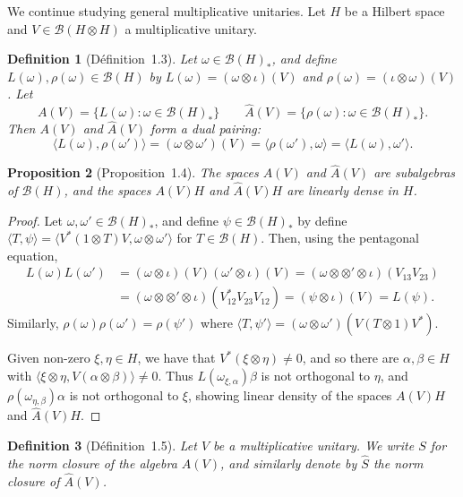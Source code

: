 \documentclass[a4paper,12pt]{article}
\theoremstyle{plain}
\newtheorem{proposition}{Proposition}[section]
\newtheorem{definition}[proposition]{Definition}
\theoremstyle{definition}
\newcommand{\ip}[2]{{\langle {#1} , {#2} \rangle}}
\newcommand{\mc}{\mathcal}
\begin{document}
We continue studying general multiplicative unitaries.
Let $H$ be a Hilbert space and $V\in\mc B(H\otimes H)$ a multiplicative
unitary.

\begin{definition}[D\'efinition~1.3]
Let $\omega\in\mc B(H)_*$, and define $L(\omega),\rho(\omega)\in\mc B(H)$
by $L(\omega) = (\omega\otimes\iota)(V)$ and
$\rho(\omega) = (\iota\otimes\omega)(V)$.  
Let
\[ A(V) = \{ L(\omega) : \omega\in\mc B(H)_* \} \qquad
\hat A(V) = \{ \rho(\omega) : \omega\in\mc B(H)_* \}. \]
Then $A(V)$ and $\hat A(V)$ form a dual pairing:
\[ \ip{L(\omega)}{\rho(\omega')} = (\omega\otimes\omega')(V)
= \ip{\rho(\omega')}{\omega} = \ip{L(\omega)}{\omega'}. \]
\end{definition}

\begin{proposition}[Proposition~1.4]\label{prop:3}
The spaces $A(V)$ and $\hat A(V)$ are subalgebras of $\mc B(H)$,
and the spaces $A(V)H$ and $\hat A(V)H$ are linearly dense in $H$.
\end{proposition}
\begin{proof}
Let $\omega,\omega'\in\mc B(H)_*$, and define $\psi\in\mc B(H)_*$ by
define $\ip{T}{\psi} = \ip{V^*(1\otimes T)V}{\omega\otimes\omega'}$ for
$T\in\mc B(H)$.  Then, using the pentagonal equation,
\begin{align*}
L(\omega) L(\omega') &= (\omega\otimes\iota)(V) (\omega'\otimes\iota)(V)
= (\omega\otimes\otimes'\otimes\iota)(V_{13}V_{23}) \\
&= (\omega\otimes\otimes'\otimes\iota)(V_{12}^* V_{23} V_{12})
= (\psi\otimes\iota)(V) = L(\psi).
\end{align*}
Similarly, $\rho(\omega) \rho(\omega') = \rho(\psi')$ where
$\ip{T}{\psi'} = (\omega\otimes\omega')(V(T\otimes 1)V^*)$.

Given non-zero $\xi,\eta\in H$, we have that $V^*(\xi\otimes\eta)\not=0$,
and so there are $\alpha,\beta\in H$ with
$\ip{\xi\otimes\eta}{V(\alpha\otimes\beta)} \not=0$.  Thus
$L(\omega_{\xi,\alpha})\beta$ is not orthogonal to $\eta$, and
$\rho(\omega_{\eta,\beta})\alpha$ is not orthogonal to $\xi$, showing
linear density of the spaces $A(V)H$ and $\hat A(V)H$.
\end{proof}

\begin{definition}[D\'efinition~1.5]
Let $V$ be a multiplicative unitary.  We write $S$ for the norm closure of
the algebra $A(V)$, and similarly denote by $\hat S$ the norm closure of
$\hat A(V)$.
\end{definition}
\end{document}

